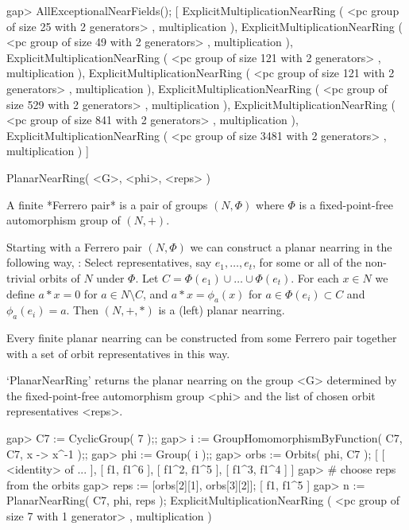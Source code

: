 \beginexample
    gap> AllExceptionalNearFields();
    [ ExplicitMultiplicationNearRing ( <pc group of size 25 with 
        2 generators> , multiplication ), 
      ExplicitMultiplicationNearRing ( <pc group of size 49 with 
        2 generators> , multiplication ), 
      ExplicitMultiplicationNearRing ( <pc group of size 121 with 
        2 generators> , multiplication ), 
      ExplicitMultiplicationNearRing ( <pc group of size 121 with 
        2 generators> , multiplication ), 
      ExplicitMultiplicationNearRing ( <pc group of size 529 with 
        2 generators> , multiplication ), 
      ExplicitMultiplicationNearRing ( <pc group of size 841 with 
        2 generators> , multiplication ), 
      ExplicitMultiplicationNearRing ( <pc group of size 3481 with 
        2 generators> , multiplication ) ]
\endexample



\>PlanarNearRing( <G>, <phi>, <reps> )

A finite *Ferrero pair* is a pair of groups $(N,\Phi)$ where $\Phi$ is a
fixed-point-free automorphism group of $(N,+)$.   

Starting with a Ferrero pair $(N,\Phi)$ we can construct a planar nearring
in the following way, \cite{Clay:Nearrings}:
Select representatives, say $e_{1},\ldots,e_{t}$, for some or all of the
non-trivial orbits of $N$ under $\Phi$. 
Let $C = \Phi(e_1)\cup\ldots\cup\Phi(e_t)$.
For each $x\in N$ we define $a * x = 0$ for $a\in N\setminus C$, and 
$a * x=\phi_{a}(x)$ for $a\in\Phi(e_{i})\subset C$ and $\phi_{a}(e_{i})=a$.
Then $(N,+,*)$ is a (left) planar nearring.

Every finite planar nearring can be constructed from some Ferrero pair 
together with a set of orbit representatives in this way.

`PlanarNearRing' returns the planar nearring on the group <G> determined by 
the fixed-point-free automorphism group <phi> and the list of chosen orbit 
representatives <reps>.

\beginexample
    gap> C7 := CyclicGroup( 7 );;
    gap> i := GroupHomomorphismByFunction( C7, C7, x -> x^-1 );;
    gap> phi := Group( i );;
    gap> orbs := Orbits( phi, C7 );
    [ [ <identity> of ... ], [ f1, f1^6 ], [ f1^2, f1^5 ], 
      [ f1^3, f1^4 ] ]
    gap> # choose reps from the orbits 
    gap> reps := [orbs[2][1], orbs[3][2]];
    [ f1, f1^5 ]
    gap> n := PlanarNearRing( C7, phi, reps );
    ExplicitMultiplicationNearRing ( <pc group of size 7 with 
    1 generator> , multiplication )
\endexample

